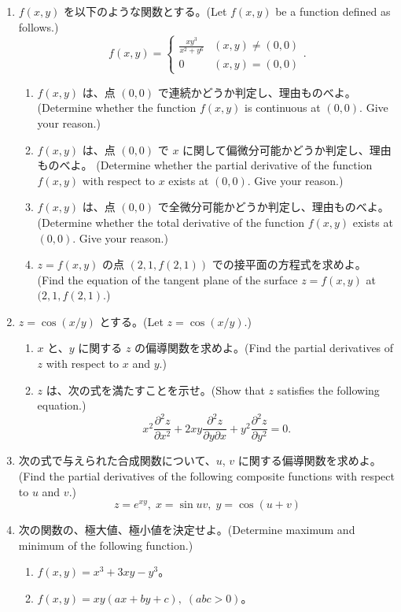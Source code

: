\begin{enumerate}
\item $f(x,y)$ を以下のような関数とする。(Let $f(x,y)$ be a function defined as follows.)
$$f(x,y) = \left\{\begin{array}{cl} \frac{xy^3}{x^2+y^6} & (x,y)\neq (0,0)\\ 0 & (x,y) = (0,0)\end{array}\right..$$
	\begin{enumerate}
	\item $f(x,y)$ は、点 $(0,0)$ で連続かどうか判定し、理由ものべよ。
	(Determine whether the function $f(x,y)$ is continuous at $(0,0)$. Give your reason.)
	\item $f(x,y)$ は、点 $(0,0)$ で $x$ に関して偏微分可能かどうか判定し、理由ものべよ。
	(Determine whether the partial derivative of the function $f(x,y)$ with respect to $x$ exists at $(0,0)$. 
	Give your reason.)
	\item $f(x,y)$ は、点 $(0,0)$ で全微分可能かどうか判定し、理由ものべよ。
	(Determine whether the total derivative of the function $f(x,y)$ exists at $(0,0)$. 
	Give your reason.)
	\item $z = f(x,y)$ の点 $(2,1,f(2,1))$ での接平面の方程式を求めよ。
	(Find the equation of the tangent plane of the surface $z = f(x,y)$ at $(2,1,f(2,1)$.)
	\end{enumerate}

\item $z = \cos(x/y)$ とする。(Let $z = \cos(x/y)$.)
     \begin{enumerate}
     \item $x$ と、$y$ に関する $z$ の偏導関数を求めよ。(Find the partial derivatives of $z$ with respect to $x$ and $y$.)
     \item $z$ は、次の式を満たすことを示せ。(Show that $z$ satisfies the following equation.)
     $$x^2\frac{\partial^2z}{\partial x^2} + 2xy\frac{\partial^2z}{\partial y\partial x} + y^2\frac{\partial^2z}{\partial y^2} = 0.$$
     \end{enumerate}

\item 次の式で与えられた合成関数について、$u$, $v$ に関する偏導関数を求めよ。(Find the partial derivatives of the following composite functions with respect to $u$ and $v$.)
$$z = e^{xy}, \;x = \sin uv, \;y = \cos(u+v)$$
 
\item 次の関数の、極大値、極小値を決定せよ。(Determine maximum and minimum of the following function.)
     \begin{enumerate}
     \item $f(x,y) = x^3 + 3xy - y^3$。
     \item $f(x,y) = xy(ax+by+c), \; (abc > 0)$。
     \end{enumerate}
\end{enumerate}
     


